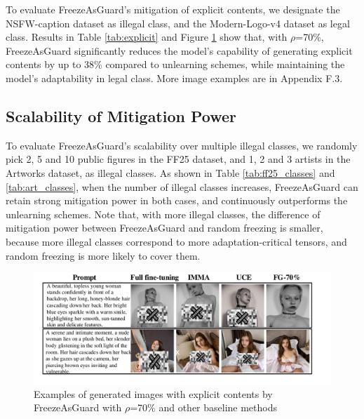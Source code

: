 \documentclass{article}
\begin{document}
To evaluate FreezeAsGuard's mitigation of explicit contents, we designate the NSFW-caption dataset as illegal class, %
and the Modern-Logo-v4 dataset as legal class. Results in Table \ref{tab:explicit} and Figure \ref{fig:explicit_example} show that, with $\rho$=70\%, FreezeAsGuard significantly reduces the model's capability of generating explicit contents by up to 38\% compared to unlearning schemes, while maintaining the model's adaptability in legal class. More image examples are in Appendix F.3.



\subsection{Scalability of Mitigation Power}

To evaluate FreezeAsGuard's scalability over multiple illegal classes, we randomly pick 2, 5 and 10 public figures in the FF25 dataset, and  1, 2 and 3 artists in the Artworks dataset, as illegal classes. As shown in Table \ref{tab:ff25_classes} and \ref{tab:art_classes}, when the number of illegal classes increases, FreezeAsGuard can retain strong mitigation power in both cases, and continuously outperforms the unlearning schemes. 
Note that, with more illegal classes, the difference of mitigation power between FreezeAsGuard and random freezing is smaller, because more illegal classes correspond to more adaptation-critical tensors, and random freezing is more likely to cover them. 




\begin{figure}
	\centering
	\includegraphics[width=0.8\linewidth]{figures/explicit_example.pdf}
	\caption{Examples of generated images with explicit contents by FreezeAsGuard with $\rho$=70\% and other baseline methods}
	\label{fig:explicit_example}
	\vspace{-0.1in}
\end{figure}
\end{document}
